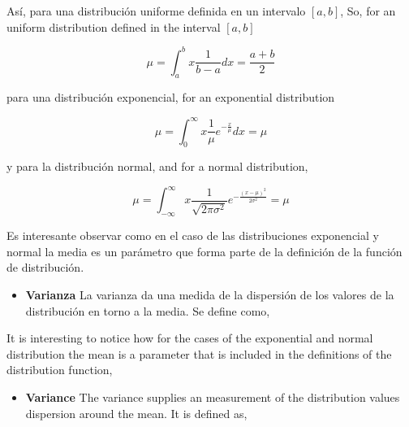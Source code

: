 \begin{paracol}{2}
Así, para una distribución uniforme definida en un intervalo $[a,b]$,
\switchcolumn
So, for an uniform distribution defined in the interval $[a,b]$
\end{paracol}
\begin{equation*}
\mu = \int_a^b x\frac{1}{b-a}dx = \frac{a+b}{2}
\end{equation*}
\begin{paracol}{2}
para una distribución exponencial,
\switchcolumn
for an exponential distribution
\end{paracol}
\begin{equation*}
\mu = \int_0^{\infty}x\frac{1}{\mu}e^{-\frac{x}{\mu}}dx = \mu
\end{equation*}
\begin{paracol}{2}
y para la distribución normal,
\switchcolumn
and for a normal distribution,
\end{paracol}

\begin{equation*}
\mu = \int_{-\infty}^{\infty}x \frac{1}{\sqrt{2\pi\sigma^2}}e^{-\frac{(x-\mu)^2}{2\sigma^2}}= \mu
\end{equation*}
\begin{paracol}{2}
Es interesante observar como en el caso de las distribuciones exponencial y normal la media es un parámetro que forma parte de la definición de la función de distribución.
\begin{itemize}
\item \textbf{Varianza} La varianza da una medida de la dispersión de los valores de 
la distribución en torno a la media. Se define como,
\end{itemize}
\switchcolumn
It is interesting to notice how for the cases of the exponential and normal distribution the mean is a parameter that is included in the definitions of the distribution function,
\begin{itemize}
	\item \textbf{Variance}  The variance supplies an measurement of the distribution values dispersion around the mean. It is defined as,
\end{itemize}
\end{paracol}


